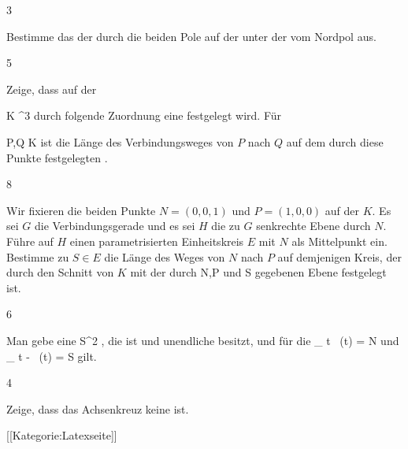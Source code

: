 {3}
{

Bestimme das
 der
durch die beiden Pole auf der
 unter der
 vom Nordpol aus.

}
{} {}

{5}
{

Zeige, dass auf der

\mavergleichskette
{\vergleichskette
{ K
}
{ \subset }{ \R^3
}
{  }{
}
{    }{
}
{   }{
}
}
{}{}{}
durch folgende Zuordnung eine
festgelegt wird. Für

\mavergleichskette
{\vergleichskette
{ P,Q
}
{ \in }{ K
}
{  }{
}
{    }{
}
{   }{
}
}
{}{}{}
ist
 die Länge des
 {} {} Verbindungsweges von $P$ nach $Q$ auf dem durch diese Punkte festgelegten
 {} {.}

}
{} {}

{8}
{

Wir fixieren die beiden Punkte $N=(0,0,1)$ und $P=(1,0,0)$ auf der
 $K$.  Es sei $G$ die Verbindungsgerade und es sei $H$ die zu $G$ senkrechte Ebene durch $N$. Führe auf $H$ einen parametrisierten Einheitskreis $E$ mit $N$ als Mittelpunkt ein. Bestimme zu $S \in E$ die Länge des
 {} {} Weges von $N$ nach $P$ auf demjenigen Kreis, der durch den Schnitt von $K$ mit der durch
\mathkor {} {N,P} {und} {S} {} gegebenen Ebene festgelegt ist.

}
{} {}

{6}
{

Man gebe eine
\maabbdisp {\varphi} {\R} {S^2
} {,}
die
 {} {}
ist und unendliche
besitzt, und für die
\mathkor {} {_{   t  \rightarrow  \infty  } \, \varphi (t) = N} {und} {_{   t  \rightarrow  - \infty  } \, \varphi (t) = S} {}
gilt.

}
{} {}

{4}
{

Zeige, dass das Achsenkreuz keine
ist.

}
{} {}

 [[Kategorie:Latexseite]]
